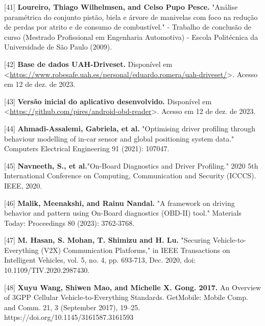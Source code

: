 [41] \textbf{Loureiro, Thiago Wilhelmsen, and Celso Pupo Pesce.} "Análise paramétrica do conjunto pistão, biela e árvore de manivelas com foco na redução de perdas por atrito e de consumo de combustível." - Trabalho de conclusão de curso (Mestrado Profissional em
Engenharia Automotiva) - Escola Politécnica da Universidade de São Paulo (2009).


[42] \textbf{Base de dados UAH-Driveset.} Disponível em <\url{https://www.robesafe.uah.es/personal/eduardo.romera/uah-driveset/}>. Acesso em 12 de dez. de 2023.


[43] \textbf{Versão inicial do aplicativo desenvolvido.} Disponível em <\url{https://github.com/pires/android-obd-reader}>. Acesso em 12 de dez. de 2023.

[44] \textbf{Ahmadi-Assalemi, Gabriela, et al.} "Optimising driver profiling through behaviour modelling of in-car sensor and global positioning system data." Computers  Electrical Engineering 91 (2021): 107047.

[45] \textbf{Navneeth, S., et al.}"On-Board Diagnostics and Driver Profiling." 2020 5th International Conference on Computing, Communication and Security (ICCCS). IEEE, 2020.

[46] \textbf{Malik, Meenakshi, and Rainu Nandal.} "A framework on driving behavior and pattern using On-Board diagnostics (OBD-II) tool." Materials Today: Proceedings 80 (2023): 3762-3768.

[47] \textbf{M. Hasan, S. Mohan, T. Shimizu and H. Lu.} "Securing Vehicle-to-Everything (V2X) Communication Platforms," in IEEE Transactions on Intelligent Vehicles, vol. 5, no. 4, pp. 693-713, Dec. 2020, doi: 10.1109/TIV.2020.2987430.

[48] \textbf{Xuyu Wang, Shiwen Mao, and Michelle X. Gong. 2017.} An Overview of 3GPP Cellular Vehicle-to-Everything Standards. GetMobile: Mobile Comp. and Comm. 21, 3 (September 2017), 19–25. https://doi.org/10.1145/3161587.3161593


